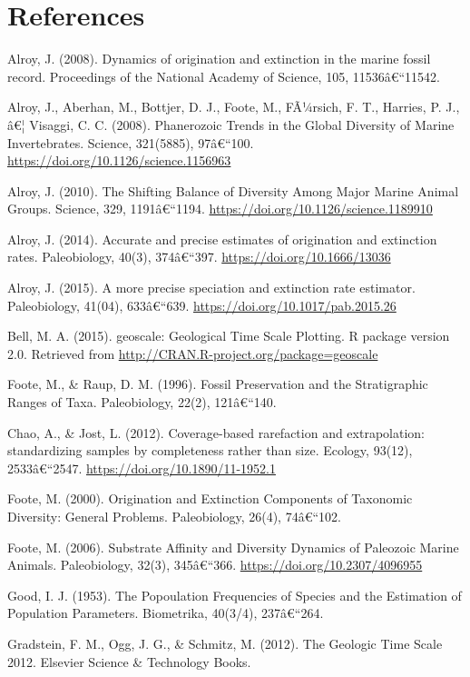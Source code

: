 \documentclass[]{article}
\begin{document}
\hypertarget{references}{%
\section{References}\label{references}}

Alroy, J. (2008). Dynamics of origination and extinction in the marine
fossil record. Proceedings of the National Academy of Science, 105,
11536â€``11542.

Alroy, J., Aberhan, M., Bottjer, D. J., Foote, M., FÃ¼rsich, F. T.,
Harries, P. J., â€¦ Visaggi, C. C. (2008). Phanerozoic Trends in the
Global Diversity of Marine Invertebrates. Science, 321(5885), 97â€``100.
\url{https://doi.org/10.1126/science.1156963}

Alroy, J. (2010). The Shifting Balance of Diversity Among Major Marine
Animal Groups. Science, 329, 1191â€``1194.
\url{https://doi.org/10.1126/science.1189910}

Alroy, J. (2014). Accurate and precise estimates of origination and
extinction rates. Paleobiology, 40(3), 374â€``397.
\url{https://doi.org/10.1666/13036}

Alroy, J. (2015). A more precise speciation and extinction rate
estimator. Paleobiology, 41(04), 633â€``639.
\url{https://doi.org/10.1017/pab.2015.26}

Bell, M. A. (2015). geoscale: Geological Time Scale Plotting. R package
version 2.0. Retrieved from
\url{http://CRAN.R-project.org/package=geoscale}

Foote, M., \& Raup, D. M. (1996). Fossil Preservation and the
Stratigraphic Ranges of Taxa. Paleobiology, 22(2), 121â€``140.

Chao, A., \& Jost, L. (2012). Coverage-based rarefaction and
extrapolation: standardizing samples by completeness rather than size.
Ecology, 93(12), 2533â€``2547. \url{https://doi.org/10.1890/11-1952.1}

Foote, M. (2000). Origination and Extinction Components of Taxonomic
Diversity: General Problems. Paleobiology, 26(4), 74â€``102.

Foote, M. (2006). Substrate Affinity and Diversity Dynamics of Paleozoic
Marine Animals. Paleobiology, 32(3), 345â€``366.
\url{https://doi.org/10.2307/4096955}

Good, I. J. (1953). The Popoulation Frequencies of Species and the
Estimation of Population Parameters. Biometrika, 40(3/4), 237â€``264.

Gradstein, F. M., Ogg, J. G., \& Schmitz, M. (2012). The Geologic Time
Scale 2012. Elsevier Science \& Technology Books.
\end{document}
